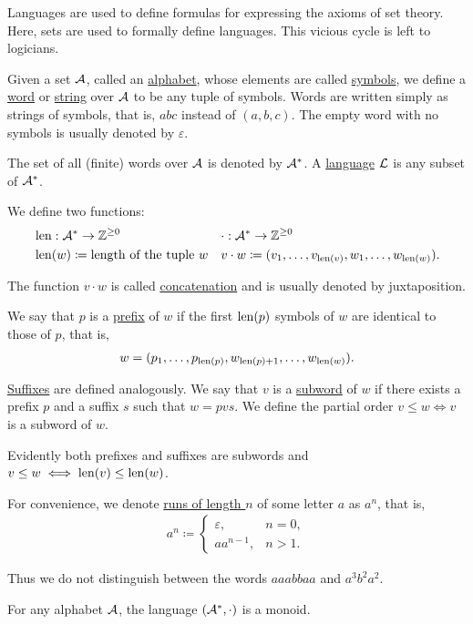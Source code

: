 Languages are used to define formulas for expressing the axioms of set theory. Here, sets are used to formally define languages. This vicious cycle is left to logicians.

\begin{definition}\label{def:language}
  Given a set $\mathcal A$, called an \uline{alphabet}, whose elements are called \uline{symbols}, we define a \uline{word} or \uline{string} over $\mathcal A$ to be any tuple of symbols. Words are written simply as strings of symbols, that is, $abc$ instead of $(a, b, c)$. The empty word with no symbols is usually denoted by $\varepsilon$.

  The set of all (finite) words over $\mathcal A$ is denoted by $\mathcal A^{*}$. A \uline{language} $\mathcal L$ is any subset of $\mathcal A^{*}$.

  We define two functions:
  \begin{align*}
    &\operatorname{len}: \mathcal A^{*} \to \mathbb Z^{\geq 0}
    &&\cdot: \mathcal A^{*} \to \mathbb Z^{\geq 0}
    \\
    &\operatorname{len}(w) \coloneqq \text{length of the tuple } w
    &&v \cdot w \coloneqq (v_1, \ldots, v_{\operatorname{len}(v)}, w_1, \ldots, w_{\operatorname{len}(w)}).
  \end{align*}

  The function $v \cdot w$ is called \uline{concatenation} and is usually denoted by juxtaposition.

  We say that $p$ is a \uline{prefix} of $w$ if the first $\operatorname{len}(p)$ symbols of $w$ are identical to those of $p$, that is,
  \begin{align*}
    w = (p_1, \ldots, p_{\operatorname{len}(p)}, w_{\operatorname{len}(p) + 1}, \ldots, w_{\operatorname{len}(w)}).
  \end{align*}

  \uline{Suffixes} are defined analogously. We say that $v$ is a \uline{subword} of $w$ if there exists a prefix $p$ and a suffix $s$ such that $w = pvs$. We define the partial order $v \leq w \iff v$ is a subword of $w$.

  Evidently both prefixes and suffixes are subwords and $v \leq w \iff \operatorname{len}(v) \leq \operatorname{len}(w)$.

  For convenience, we denote \uline{runs of length $n$} of some letter $a$ as $a^n$, that is,
  \begin{align*}
    a^n \coloneqq \begin{cases}
      \varepsilon, &n = 0, \\
      a a^{n-1}, &n > 1.
    \end{cases}
  \end{align*}

  Thus we do not distinguish between the words $aaabbaa$ and $a^3 b^2 a^2$.
\end{definition}

\begin{proposition}\label{thm:set_of_all_words_is_monoid}
  For any alphabet $\mathcal A$, the language $(\mathcal A^{*}, \cdot)$ is a monoid.
\end{proposition}
